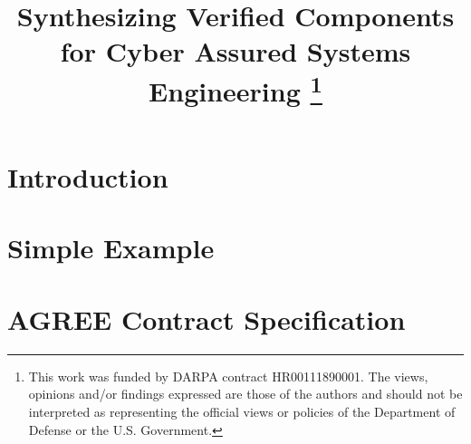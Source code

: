 \documentclass[conference]{IEEEtran}
\theoremstyle{plain}
\theoremstyle{definition}
\theoremstyle{remark}
\begin{document}
\title{
  Synthesizing Verified Components for Cyber Assured Systems Engineering 
  \thanks{{This work was funded by DARPA contract HR00111890001. The
views, opinions and/or findings expressed are those of the authors
and should not be interpreted as representing the official views or
policies of the Department of Defense or the U.S. Government.}
  }
}

\author{
\and
{}
\and
{}
}

\maketitle

\begin{abstract}

\end{abstract}

\IEEEpeerreviewmaketitle

\section{Introduction} \label{sec:intro}


\section{Simple Example} \label{sec:example}


\section{AGREE Contract Specification} \label{sec:agree}

\end{document}
